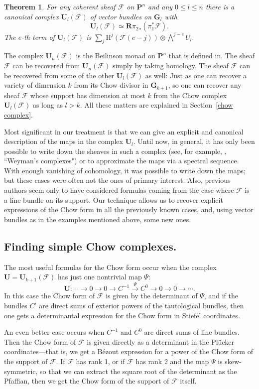\documentclass{jams-l}
\newtheorem{theorem}{Theorem}[section]
\theoremstyle{definition}
\theoremstyle{remark}
\newcommand{\F}{{\mathcal F}}
\newcommand{\GG}{{\mathbf G}}
\newcommand{\Hrm}{{\mathrm H}}
\newcommand{\PP}{{\mathbf P}}
\newcommand{\UU}{{\mathbf U}}
\newcommand{\rTo}{\xrightarrow}
\newcommand{\rTox}{\rightarrow}
\begin{document}
\begin{theorem}\label{first main} For any coherent sheaf $\F$ on $\PP^n$
and any $0\leq l\leq n$ there
is a canonical complex $\UU_l(\F)$ of
vector bundles on $\GG_l$ 
with
\[
\UU_l(\F) \simeq {{\mathbf R}\pi_{2}}_*(\pi_{1}^*\F).
\] 
The $e$-th term of $\UU_l(\F)$ is
$
\sum_j \Hrm^j(\F(e-j))\otimes\bigwedge^{j-e}U_l.
$
\end{theorem}
The complex $\UU_n(\F)$ is the Beilinson monad on $\PP^n$
that is defined in\linebreak \cite{Eisenbudetal.2001}. The sheaf $\F$ can be
recovered from $\UU_n(\F)$ simply by taking homology. The sheaf 
$\F$ can be recovered from some
of the other $\UU_l(\F)$ as well: Just as one
can recover a variety of dimension
$k$ from its Chow divisor in $\GG_{k+1}$, so one can recover any sheaf $\F$
whose support has dimension at most $k$ from the Chow complex $\UU_l(\F)$
as long as $l>k$. All these matters are explained in Section~\ref{chow
complex}.
 
Most significant in our treatment is that we can give
an explicit and canonical description of the maps
in the complex $\UU_l$. Until now, in general,
it has only been possible
to write down the sheaves in such a complex 
(see, for example, \cite[Section 3.4E]{Gelfandetal.1994},
``Weyman's complexes") or to approximate
the maps via a spectral sequence. With
enough vanishing of cohomology, it was possible to write
down the maps; but these cases were often not
the ones of primary interest.
Also, previous authors seem only to have considered 
formulas coming from the case where $\F$ is a line bundle on its support.
Our technique allows us to recover  explicit expressions of the Chow
form in all the previously known cases, and, using vector bundles
as in the examples mentioned above, some new ones.

\subsection*{Finding simple Chow complexes. }
The most useful formulas for the Chow form
occur when the complex $\UU=\UU_{k+1}(\F)$ has just one nontrivial map $\Psi$:
\[
\UU: \cdots\rTox 0\rTox 0\rTox C^{-1}\rTo{\Psi} C^{0}\rTox 0\rTox 0\rTox\cdots .
\]
In this case the 
Chow form of $\F$ is given by the determinant of $\Psi$, and if the bundles 
$C^i$ are direct sums of exterior powers
of the tautological bundles, then one gets a determinantal
expression for the Chow form in Stiefel coordinates.

An even better case occurs when 
$C^{-1}$ and $C^0$ are direct sums of line bundles.  Then  the 
 Chow form of $\F$ is given
directly as a determinant in the Pl\"ucker coordinates---that is, we get a 
B\'ezout expression  for a
power of the Chow form of the support of $\F$. If $\F$ has
rank 1, or if $\F$ has rank 2 and the map $\Psi$ is skew-symmetric,
so that we can extract the square root of the determinant as the
Pfaffian, then we get the Chow form of the support of $\F$ itself.
\end{document}
